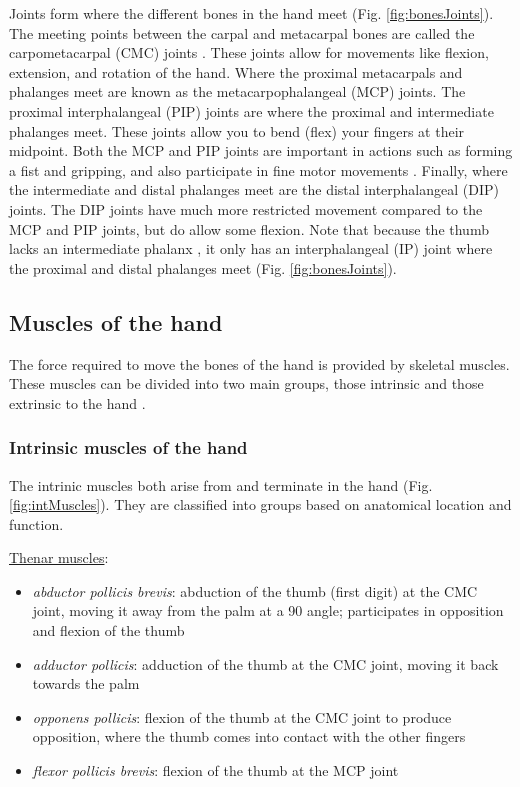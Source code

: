 \documentclass[12pt]{article}
\begin{document}
Joints form where the different bones in the hand meet \citep{tortora2014principles} (Fig. \ref{fig:bonesJoints}). The meeting points between the carpal and metacarpal bones are called the carpometacarpal (CMC) joints \citep{ombregt2013applied,panchal2013skeletal}. These joints allow for movements like flexion, extension, and rotation of the hand. Where the proximal metacarpals and phalanges meet are known as the metacarpophalangeal (MCP) joints. The proximal interphalangeal (PIP) joints are where the proximal and intermediate phalanges meet. These joints allow you to bend (flex) your fingers at their midpoint. Both the MCP and PIP joints are important in actions such as forming a fist and gripping, and also participate in fine motor movements \citep{duncan2013biomechanics}. Finally, where the intermediate and distal phalanges meet are the distal interphalangeal (DIP) joints. The DIP joints have much more restricted movement compared to the MCP and PIP joints, but do allow some flexion. Note that because the thumb lacks an intermediate phalanx \citep{panchal2013skeletal}, it only has an interphalangeal (IP) joint where the proximal and distal phalanges meet (Fig. \ref{fig:bonesJoints}).

\subsection*{Muscles of the hand}

The force required to move the bones of the hand is provided by skeletal muscles. These muscles can be divided into two main groups, those intrinsic and those extrinsic to the hand \citep{openStaxMuscles,tortora2014principles,ombregt2013applied}. 

\subsubsection*{Intrinsic muscles of the hand}

The intrinic muscles both arise from and terminate in the hand \citep{openStaxMuscles,tortora2014principles,ombregt2013applied,schreuders2007intrinsic} (Fig. \ref{fig:intMuscles}). They are classified into groups based on anatomical location and function.

\underline{Thenar muscles}: 
\begin{itemize}
    \item \textit{abductor pollicis brevis}: abduction of the thumb (first digit) at the CMC joint, moving it away from the palm at a {90\degree} angle; participates in opposition and flexion of the thumb
    \item \textit{adductor pollicis}: adduction of the thumb at the CMC joint, moving it back towards the palm
    \item \textit{opponens pollicis}: flexion of the thumb at the CMC joint to produce opposition, where the thumb comes into contact with the other fingers
    \item \textit{flexor pollicis brevis}: flexion of the thumb at the MCP joint
\end{itemize}
\end{document}
